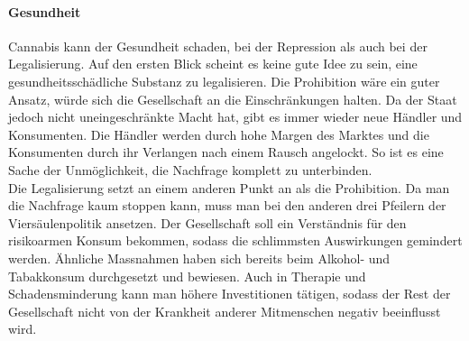 \documentclass[../main.tex]{subfiles}
\begin{document}
	\paragraph{Gesundheit}
	Cannabis kann der Gesundheit schaden, bei der Repression als auch bei der Legalisierung.
	Auf den ersten Blick scheint es keine gute Idee zu sein, eine gesundheitsschädliche Substanz zu legalisieren.
	Die Prohibition wäre ein guter Ansatz, würde sich die Gesellschaft an die Einschränkungen halten.
	Da der Staat jedoch nicht uneingeschränkte Macht hat, gibt es immer wieder neue Händler und Konsumenten.
	Die Händler werden durch hohe Margen des Marktes und die Konsumenten durch ihr Verlangen nach einem Rausch angelockt.
	So ist es eine Sache der Unmöglichkeit, die Nachfrage komplett zu unterbinden.\\
	
	\noindent
	Die Legalisierung setzt an einem anderen Punkt an als die Prohibition.
	Da man die Nachfrage kaum stoppen kann, muss man bei den anderen drei Pfeilern der Viersäulenpolitik ansetzen.
	Der Gesellschaft soll ein Verständnis für den risikoarmen Konsum bekommen, sodass die schlimmsten Auswirkungen gemindert werden.
	Ähnliche Massnahmen haben sich bereits beim Alkohol- und Tabakkonsum durchgesetzt und bewiesen.
	Auch in Therapie und Schadensminderung kann man höhere Investitionen tätigen, sodass der Rest der Gesellschaft nicht von der Krankheit anderer Mitmenschen negativ beeinflusst wird.
	
	

	
\end{document}
